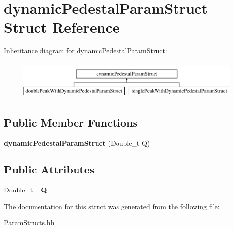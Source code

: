 \hypertarget{structdynamic_pedestal_param_struct}{}\section{dynamic\+Pedestal\+Param\+Struct Struct Reference}
\label{structdynamic_pedestal_param_struct}
Inheritance diagram for dynamic\+Pedestal\+Param\+Struct\+:\begin{figure}[H]
\begin{center}
\leavevmode
\includegraphics[height=2.000000cm]{structdynamic_pedestal_param_struct}
\end{center}
\end{figure}
\subsection*{Public Member Functions}
\begin{DoxyCompactItemize}
\item 
\hypertarget{structdynamic_pedestal_param_struct_a7ffeca608a7b6c23b4d8fbf890b7083a}{}{\bfseries dynamic\+Pedestal\+Param\+Struct} (Double\+\_\+t Q)\label{structdynamic_pedestal_param_struct_a7ffeca608a7b6c23b4d8fbf890b7083a}

\end{DoxyCompactItemize}
\subsection*{Public Attributes}
\begin{DoxyCompactItemize}
\item 
\hypertarget{structdynamic_pedestal_param_struct_a50bb36d950b91597e5a159ceaaa9e7c0}{}Double\+\_\+t {\bfseries \+\_\+\+Q}\label{structdynamic_pedestal_param_struct_a50bb36d950b91597e5a159ceaaa9e7c0}

\end{DoxyCompactItemize}


The documentation for this struct was generated from the following file\+:\begin{DoxyCompactItemize}
\item 
Param\+Structs.\+hh\end{DoxyCompactItemize}
